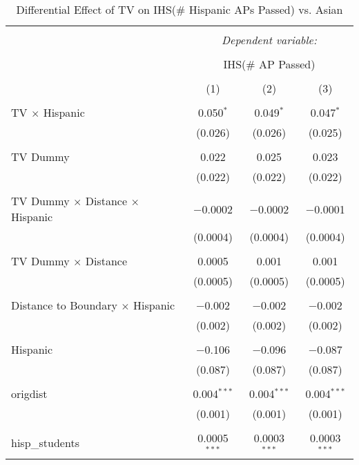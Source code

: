 
\begin{table}[!htbp] \centering 
  \caption{Differential Effect of TV on IHS(\# Hispanic APs Passed) vs. Asian} 
  \label{} 
\begin{tabular}{@{\extracolsep{-2pt}}lccc} 
\\[-1.8ex]\hline 
\hline \\[-1.8ex] 
 & \multicolumn{3}{c}{\textit{Dependent variable:}} \\ 
\cline{2-4} 
\\[-1.8ex] & \multicolumn{3}{c}{IHS(\# AP Passed)} \\ 
\\[-1.8ex] & (1) & (2) & (3)\\ 
\hline \\[-1.8ex] 
 TV $\times$ Hispanic & 0.050$^{*}$ & 0.049$^{*}$ & 0.047$^{*}$ \\ 
  & (0.026) & (0.026) & (0.025) \\ 
  & & & \\ 
 TV Dummy & 0.022 & 0.025 & 0.023 \\ 
  & (0.022) & (0.022) & (0.022) \\ 
  & & & \\ 
 TV Dummy $\times$ Distance $\times$ Hispanic & $-$0.0002 & $-$0.0002 & $-$0.0001 \\ 
  & (0.0004) & (0.0004) & (0.0004) \\ 
  & & & \\ 
 TV Dummy $\times$ Distance & 0.0005 & 0.001 & 0.001 \\ 
  & (0.0005) & (0.0005) & (0.0005) \\ 
  & & & \\ 
 Distance to Boundary $\times$ Hispanic & $-$0.002 & $-$0.002 & $-$0.002 \\ 
  & (0.002) & (0.002) & (0.002) \\ 
  & & & \\ 
 Hispanic & $-$0.106 & $-$0.096 & $-$0.087 \\ 
  & (0.087) & (0.087) & (0.087) \\ 
  & & & \\ 
 origdist & 0.004$^{***}$ & 0.004$^{***}$ & 0.004$^{***}$ \\ 
  & (0.001) & (0.001) & (0.001) \\ 
  & & & \\ 
 hisp\_students & 0.0005$^{***}$ & 0.0003$^{***}$ & 0.0003$^{***}$ \\ 

\end{tabular}
\end{table}
